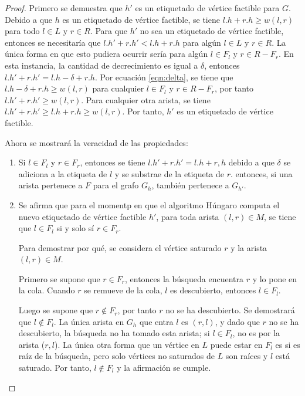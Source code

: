 \documentclass[10pt]{article} %
\begin{document}
	\begin{proof}
		Primero se demuestra que $h'$ es un etiquetado de v\'ertice factible para $G$. Debido a que $h$ es un etiquetado de v\'ertice factible, se tiene $l.h + r.h \geq w(l,r)$ para todo $l \in L$ y $r \in R$. Para que $h'$ no sea un etiquetado de v\'ertice factible, entonces se necesitar\'ia que $l.h' + r.h' < l.h + r.h$ para alg\'un $l \in L$ y $r \in R$. La \'unica forma en que esto pudiera ocurrir ser\'ia para alg\'un $l \in F_l$ y $r \in R-F_r$. En esta instancia, la cantidad de decrecimiento es igual a $\delta$, entonces $l.h' + r.h' = l.h - \delta + r.h$. Por ecuaci\'on \ref{eqn:delta}, se tiene que $l.h - \delta + r.h \geq w(l,r)$ para cualquier $l \in F_l$ y $r \in R - F_r$, por tanto $l.h' + r.h' \geq w(l,r)$. Para cualquier otra arista, se tiene $l.h' + r.h' \geq l.h + r.h \geq w(l,r)$. Por tanto, $h'$ es un etiquetado de v\'ertice factible.
		
		Ahora se mostrar\'a la veracidad de las propiedades:
		
		\begin{enumerate}
			\item Si $l \in F_l$ y $r \in F_r$, entonces se tiene $l.h' + r.h' = l.h + r,h$ debido a que $\delta$ se adiciona a la etiqueta de $l$ y se substrae de la etiqueta de $r$. entonces, si una arista pertenece a $F$ para el grafo $G_h$, tambi\'en pertenece a $G_{h'}$.
			\item Se afirma que para el momentp en que el algoritmo H\'ungaro computa el nuevo etiquetado de v\'ertice factible $h'$, para toda arista $(l,r) \in M$, se tiene que $l \in F_l$ si y solo s\'i $r \in F_r$. 
			
			Para demostrar por qu\'e, se considera el v\'ertice saturado $r$ y la arista $(l,r) \in M$. 
			
			Primero se supone que $r \in F_r$, entonces la b\'usqueda encuentra $r$ y lo pone en la cola. Cuando $r$ se remueve de la cola, $l$ es descubierto, entonces $l \in F_l$. 
			
			Luego se supone que $r \notin F_r$, por tanto $r$ no se ha descubierto. Se demostrar\'a que $l \notin F_l$. La \'unica arista en $G_h$ que entra $l$ es $(r,l)$, y dado que $r$ no se ha descubierto, la b\'usqueda no ha tomado esta arista; si $l \in F_l$, no es por la arista ($r,l$). La \'unica otra forma que un v\'ertice en $L$ puede estar en $F_l$ es si es ra\'iz de la b\'usqueda, pero solo v\'ertices no saturados de $L$ son ra\'ices y $l$ est\'a saturado. Por tanto, $l \notin F_l$ y la afirmaci\'on se cumple.
			

\end{enumerate}
\end{proof}
\end{document}
